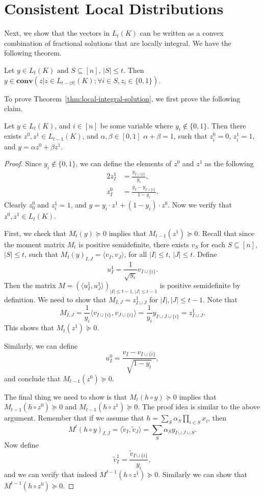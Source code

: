 \documentclass[a4paper,twoside,justified]{tufte-handout}
\begin{document}
\section{Consistent Local Distributions}
Next, we show that the vectors in $L_t(K)$ can be written as a convex
combination of fractional solutions that are locally integral. 
We have the following theorem.
\begin{theorem}\label{thm:local-integral-solution}
  Let $y \in L_t(K)$ and $S \subseteq [n]$, $|S| \le t$.
  Then $y \in \mathbf{conv}(z | z \in L_{t-|S|}(K); \forall i \in S, z_i \in \{0,1\})$.
\end{theorem}
To prove Theorem~\ref{thm:local-integral-solution}, we first prove the following claim.
\begin{claim}\label{claim:main-local-integral-claim}
  Let $y \in L_t(K)$, and $i \in [n]$ be some variable where $y_i \notin \{0,1\}$.
  Then there exists $z^0, z^1 \in L_{t-1}(K)$, and $\alpha, \beta \in [0,1]$
  $\alpha+\beta=1$, such that $z^0_i=0$, $z^1_i=1$, and $y=\alpha z^0 + \beta z^1$.
\end{claim}
\begin{proof}
  Since $y_i \notin \{0,1\}$, we can define the elements of $z^0$ and $z^1$ as
  the following
  \begin{alignat*}{2}
    z^1_I &= \frac{y_{I \cup \{i\}}}{y_i}, \\
    z^0_I &= \frac{y_I - y_{I \cup \{i\}}}{1-y_i}.
  \end{alignat*}
  Clearly $z^0_0$ and $z^1_i=1$, and $y=y_i \cdot z^1 + (1-y_i) \cdot z^0$.
  Now we verify that $z^0, z^1 \in L_t(K)$.

  First, we check that $M_t(y) \succeq 0$ implies that $M_{t-1}(z^1) \succeq 0$.
  Recall that since the moment matrix $M_t$ is positive semidefinite,
  there exists $v_S$ for each $S \subseteq [n]$, $|S| \le t$, 
  such that $M_t(y)_{I,J}=\langle v_I, v_J \rangle$, for all $|I| \le t$, $|J| \le t$.
  Define
  \[
  u^1_I = \frac{1}{\sqrt{y_i}} v_{I \cup \{i\}}.
  \]
  Then the matrix $M=(\langle u^1_I, u^1_J \rangle)_{|I| \le t-1, |J| \le t-1}$
  is positive semidefinite by definition. We need to show that $M_{I,J}=z^1_{I \cup J}$
  for $|I|,|J| \le t-1$. Note that
  \[
  M_{I,J} = \frac{1}{y_i} \langle v_{I \cup \{i\}}, v_{J \cup \{i\}} \rangle
  =\frac{1}{y_i} y_{I \cup J \cup \{i\}} = z^1_{I \cup J}.
  \]
  This shows that $M_t(z^1) \succeq 0$.

  Similarly, we can define
  \[
  u^0_I = \frac{v_I - v_{I \cup \{i\}}}{\sqrt{1-y_i}},
  \]
  and conclude that $M_{t-1}(z^0) \succeq 0$.

  The final thing we need to show is that $M_t(h \circ y) \succeq 0$
  implies that $M_{t-1}(h \circ z^0) \succeq 0$ and $M_{t-1}(h \circ z^1) \succeq 0$.
  The proof idea is similar to the above argument.
  Remember that if we assume that $h=\sum_S \alpha_S \prod_{i \in S} x_i$,
  then
  \[
  M^t(h \circ y)_{I,J} = \langle \tilde{v}_I, \tilde{v}_J \rangle 
  = \sum_S \alpha_S y_{I \cup J \cup S}.
  \]
  Now define 
  \[
  \tilde{v}^1_I = \frac{\tilde{v}_{I \cup \{i\}}}{y_i},
  \]
  and we can verify that indeed $M^{t-1}(h \circ z^1) \succeq 0$.
  Similarly we can show that $M^{t-1}(h \circ z^0) \succeq 0$.
\end{proof}
\end{document}
